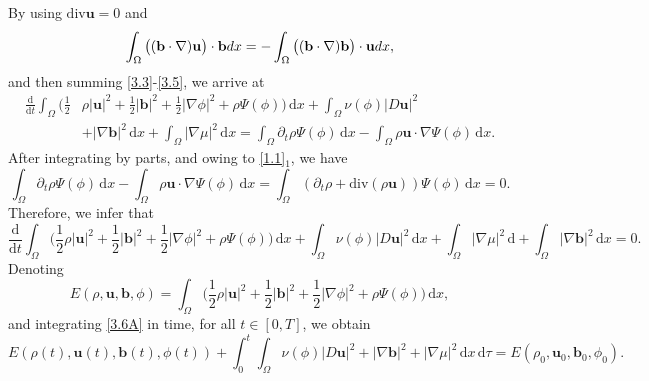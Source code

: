 \documentclass[11pt]{article}
\numberwithin{equation}{section}
\begin{document}
By using $\text{div}\mathbf{u}=0$ and
\begin{equation*}
\int_{\Omega}\big((\mathbf{b}\cdot\nabla) \mathbf{u}\big)\cdot \mathbf{b}dx=-\int_{\Omega}\big((\mathbf{b}\cdot\nabla) \mathbf{b}\big)\cdot \mathbf{u}dx,\notag
\end{equation*}
and then  summing \eqref{3.3}-\eqref{3.5}, we arrive at
\begin{align*}
\frac{\mathrm{d}}{\mathrm{d}t} \int_{\Omega}\big( \frac{1}{2} &\rho |\mathbf{u}|^2 + \frac{1}{2} |\mathbf{b}|^2 + \frac{1}{2} |\nabla \phi|^2 + \rho \Psi(\phi)\big) \, \mathrm{d}x + \int_{\Omega} \nu(\phi) |D \mathbf{u}|^2\\
&+|\nabla\mathbf{b}|^2 \, \mathrm{d}x + \int_{\Omega} |\nabla \mu|^2 \, \mathrm{d}x = \int_{\Omega} \partial_t \rho \Psi(\phi) \, \mathrm{d}x - \int_{\Omega} \rho \mathbf{u} \cdot \nabla \Psi(\phi) \, \mathrm{d}x.
\end{align*}
After integrating by parts, and owing to  \eqref{1.1}$_{1}$, we have
\begin{equation*}
\int_{\Omega} \partial_t \rho \Psi(\phi) \, \mathrm{d}x - \int_{\Omega} \rho \mathbf{u} \cdot \nabla \Psi(\phi) \, \mathrm{d}x = \int_{\Omega} (\partial_t \rho + \mathrm{div}(\rho \mathbf{u})) \Psi(\phi) \, \mathrm{d}x = 0.
\end{equation*}
Therefore, we infer that
\begin{equation}\label{3.6A}
\frac{\mathrm{d}}{\mathrm{d}t} \int_{\Omega}\big( \frac{1}{2} \rho |\mathbf{u}|^2 + \frac{1}{2} |\mathbf{b}|^2 + \frac{1}{2} |\nabla \phi|^2 + \rho \Psi(\phi)\big) \, \mathrm{d}x + \int_{\Omega} \nu(\phi) |D \mathbf{u}|^2 \, \mathrm{d}x + \int_{\Omega} |\nabla \mu|^2 \, \mathrm{d}+\int_{\Omega}|\nabla\mathbf{b}|^2 \, \mathrm{d}x  = 0.
\end{equation}
Denoting
\begin{equation*}
E(\rho, \mathbf{u},\mathbf{b},\phi) = \int_{\Omega}\big( \frac{1}{2} \rho |\mathbf{u}|^2 + \frac{1}{2} |\mathbf{b}|^2 + \frac{1}{2} |\nabla \phi|^2 + \rho \Psi(\phi)\big) \, \mathrm{d}x ,
\end{equation*}
and integrating \eqref{3.6A}  in time,  for all \( t \in [0,T] \), we obtain
\begin{equation}\label{3.7AAA}
E(\rho(t), \mathbf{u}(t),\mathbf{b}(t), \phi(t)) + \int_{0}^{t} \int_{\Omega} \nu(\phi) |D \mathbf{u}|^2 +|\nabla\mathbf{b}|^2 + |\nabla \mu|^2 \, \mathrm{d}x \, \mathrm{d}\tau = E(\rho_0, \mathbf{u}_0,\mathbf{b}_0, \phi_0).
\end{equation}
\end{document}
